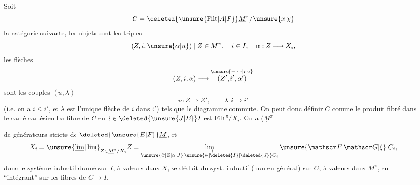 Soit
\[
C=\deleted{\unsure{\mathrm{Filt}|A|F}}\underline{M}^{\pi}/\unsure{x|\chi}
\]
la catégorie suivante, les objets sont les triples
\[
(Z,i,\unsure{\alpha|u})\mid Z\in M^{\pi},\quad i\in I,\quad \alpha:Z\longrightarrow X_i,
\]
les flèches
\[
(Z,i,\alpha)\longrightarrow \overset{\unsure{{-}\,\smile|r\,u}}{(Z',i',\alpha')}
\]
sont les couples $(u,\lambda)$ 
\[
u:Z\longrightarrow Z',\qquad \lambda:i\longrightarrow i'
\]
(i.e. on a $i\leq i'$, et $\lambda$ est l'unique flèche de $i$ dans $i'$)
tels que le diagramme
commute. On peut donc définir $C$ comme le produit fibré dans le carré cartésien
 La fibre de $C$ en $i\in\deleted{\unsure{J|E}}I$ est $\mathrm{Filt}^{\pi}/X_i$. On a 
 ($\underline M^{\pi}$ 

 de générateurs stricts de $\deleted{\unsure{E|F}}\underline M$, et
\[
X_i=\unsure{\underline{\lim}|\varinjlim}_{Z\in\underline M^{\pi}/X_i}Z
=\varinjlim_{\unsure{\partial|Z|\alpha|J}\,\unsure{\in|\deleted{I}|\deleted{J}}C_i}\unsure{\mathscr F|\mathscr G|\xi}|C_i,
\]
donc le système inductif donné  sur $I$, à valeurs dans $X$, se déduit du syst. inductif (non  en général) sur $C$, à valeurs dans $\underline M^{\pi}$, en ``intégrant'' sur les fibres de $C\longrightarrow I$.

